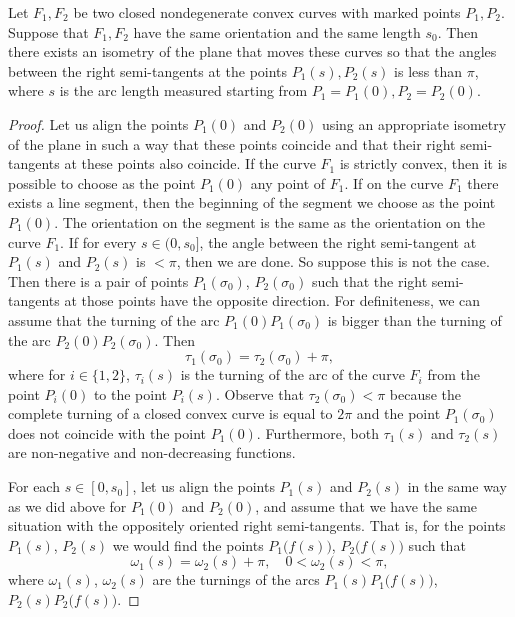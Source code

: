 \documentclass[10pt,a4paper]{amsart}
\begin{document}
\begin{lemma}
\label{Lem:3}
Let $F_1, F_2$ be two closed nondegenerate convex curves with marked points $P_1, P_2$. Suppose that $F_1, F_2$ have the same orientation and the same length $s_0$. Then there exists an isometry of the plane that moves these curves so that the angles between the right semi-tangents at the points $P_1(s), P_2(s)$ is less than $\pi$, where $s$ is the arc length measured starting from $P_1=P_1(0), P_2=P_2(0)$. 
\end{lemma}

\begin{proof}
Let us align the points $P_1(0)$ and $P_2(0)$ using an appropriate isometry of the plane in such a way that these points coincide and that their right semi-tangents at these points also coincide. 
If the curve $F_1$ is strictly convex, then it is possible to choose as the point $P_1(0)$ any point of $F_1$. If on the curve $F_1$ there exists a line segment, then the beginning of the segment we choose as the point $P_1(0)$. The orientation on the segment is the same as the orientation on the curve $F_1$.
If for every $s \in (0, s_0]$, the angle between the right semi-tangent at $P_1(s)$ and $P_2(s)$ is $<\pi$, then we are done. So suppose this is not the case. Then there is a pair of points $P_1(\sigma_0)$, $P_2(\sigma_0)$ such that the right semi-tangents at those points have the opposite direction. For definiteness, we can assume that the turning of the arc $P_1(0)P_1(\sigma_0)$ is bigger than the turning of the arc $P_2(0)P_2(\sigma_0)$. Then
\[
\tau_1(\sigma_0) = \tau_2(\sigma_0) + \pi,
\] 
where for $i \in \{1,2\}$, $\tau_i(s)$ is the turning of the arc of the curve $F_i$ from the point $P_i(0)$ to the point $P_i(s)$. Observe that $\tau_2(\sigma_0) < \pi$ because the complete turning of a closed convex curve is equal to $2\pi$ and the point $P_1(\sigma_0)$ does not coincide with the point $P_1(0)$. Furthermore, both $\tau_1(s)$ and $\tau_2(s)$ are non-negative and non-decreasing functions.

For each $s \in [0, s_0]$, let us align the points $P_1(s)$ and $P_2(s)$ in the same way as we did above for $P_1(0)$ and $P_2(0)$, and assume that we have the same situation with the oppositely oriented right semi-tangents. That is, for the points $P_1(s)$, $P_2(s)$ we would find the points $P_1\big(f(s)\big)$, $P_2\big(f(s)\big)$ such that
\[
\omega_1(s) = \omega_2(s) + \pi, \quad 0 < \omega_2(s) < \pi,
\]  
where $\omega_1(s)$, $\omega_2(s)$ are the turnings of the arcs $P_1(s) P_1\big(f(s)\big)$, $P_2(s) P_2\big(f(s)\big)$.


\end{proof}
\end{document}
